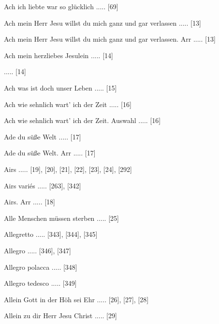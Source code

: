 \documentclass[twocolumn]{book}
\begin{document}
\newline 
Ach ich liebte war so glücklich ..... [69]

\newline 
Ach mein Herr Jesu willst du mich ganz und gar verlassen ..... [13]

\newline 
Ach mein Herr Jesu willst du mich ganz und gar verlassen. Arr ..... [13]

\newline 
Ach mein herzliebes Jesulein ..... [14]

 ..... [14]

\newline 
Ach was ist doch unser Leben ..... [15]

\newline 
Ach wie sehnlich wart' ich der Zeit ..... [16]

\newline 
Ach wie sehnlich wart' ich der Zeit. Auswahl ..... [16]

\newline 
Ade du süße Welt ..... [17]

\newline 
Ade du süße Welt. Arr ..... [17]

\newline 
Airs ..... [19], [20], [21], [22], [23], [24], [292]

\newline 
Airs variés ..... [263], [342]

\newline 
Airs. Arr ..... [18]

\newline 
Alle Menschen müssen sterben ..... [25]

\newline 
Allegretto ..... [343], [344], [345]

\newline 
Allegro ..... [346], [347]

\newline 
Allegro polacca ..... [348]

\newline 
Allegro tedesco ..... [349]

\newline 
Allein Gott in der Höh sei Ehr ..... [26], [27], [28]

\newline 
Allein zu dir Herr Jesu Christ ..... [29]
\end{document}
